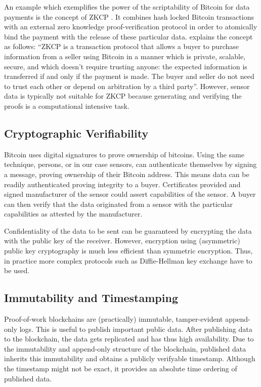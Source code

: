 An example which exemplifies the power of the scriptability of Bitcoin for data payments is the concept of \ac{ZKCP} \parencite{maxwell2016zk,cryptoeprint:2016:451}. It combines hash locked Bitcoin transactions with an external zero knowledge proof-verification protocol in order to atomically bind the payment with the release of these particular data. \cite{maxwell2016zk} explains the concept as follows: ``\ac{ZKCP} is a transaction protocol that allows a buyer to purchase information from a seller using Bitcoin in a manner which is private, scalable, secure, and which doesn’t require trusting anyone: the expected information is transferred if and only if the payment is made. The buyer and seller do not need to trust each other or depend on arbitration by a third party''. However, sensor data is typically not suitable for \ac{ZKCP} because generating and verifying the proofs is a computational intensive task.

\subsection{Cryptographic Verifiability}

Bitcoin uses digital signatures to prove ownership of bitcoins. Using the same technique, persons, or in our case sensors, can authenticate themselves by signing a message, proving ownership of their Bitcoin address. This means data can be readily authenticated proving integrity to a buyer. Certificates provided and signed manufacturer of the sensor could assert capabilities of the sensor. A buyer can then verify that the data originated from a sensor with the particular capabilities as attested by the manufacturer.

Confidentiality of the data to be sent can be guaranteed by encrypting the data with the public key of the receiver. However, encryption using (asymmetric) public key cryptography is much less efficient than symmetric encryption. Thus, in practice more complex protocols such as Diffie-Hellman key exchange \parencite{ISI:A1976CQ59200001} have to be used.

\subsection{Immutability and Timestamping}

Proof-of-work blockchains are (practically) immutable, tamper-evident append-only logs. This is useful to publish important public data. After publishing data to the blockchain, the data gets replicated and has thus high availability. Due to the immutability and append-only structure of the blockchain, published data inherits this immutability and obtains a publicly verifyable timestamp. Although the timestamp might not be exact, it provides an absolute time ordering of published data. 

